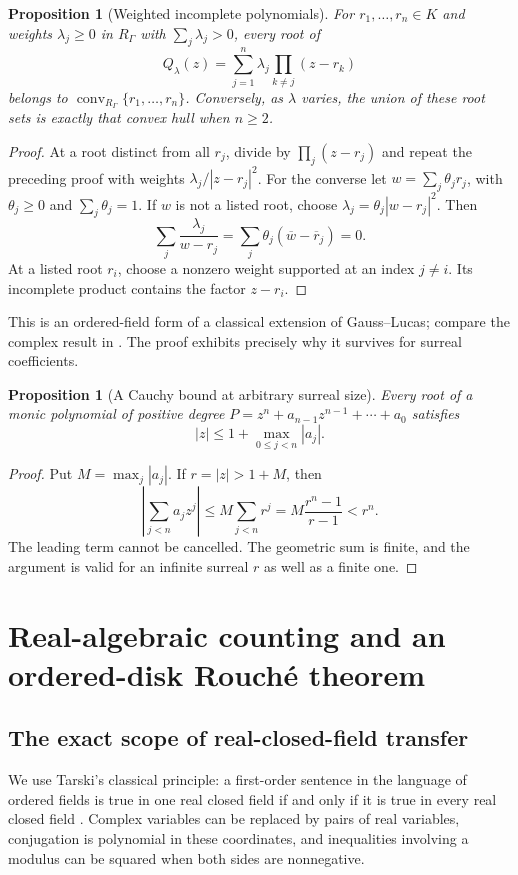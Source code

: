 \documentclass[11pt,letterpaper,oneside]{article}
\numberwithin{equation}{section}
\newtheorem{proposition}[theorem]{Proposition}
\theoremstyle{definition}
\theoremstyle{remark}\newtheorem{remark}[theorem]{Remark}
\newcommand{\conv}{\operatorname{conv}}\newcommand{\Bez}{\operatorname{Bez}}
\begin{document}
\begin{proposition}[Weighted incomplete polynomials]\label{prop:weighted}
For $r_1,\ldots,r_n\in K$ and weights $\lambda_j\geq0$ in $R_\Gamma$
with $\sum_j\lambda_j>0$, every root of
\[
 Q_\lambda(z)=\sum_{j=1}^n\lambda_j
       \prod_{k\ne j}(z-r_k)
\]
belongs to $\conv_{R_\Gamma}\{r_1,\ldots,r_n\}$. Conversely, as
$\lambda$ varies, the union of these root sets is exactly that convex hull
when $n\geq2$.
\end{proposition}
\begin{proof}
At a root distinct from all $r_j$, divide by $\prod_j(z-r_j)$ and repeat
the preceding proof with weights $\lambda_j/|z-r_j|^2$.
For the converse let $w=\sum_j\theta_jr_j$, with
$\theta_j\geq0$ and $\sum_j\theta_j=1$. If $w$ is not a listed root,
choose $\lambda_j=\theta_j|w-r_j|^2$. Then
\[
 \sum_j\frac{\lambda_j}{w-r_j}
 =\sum_j\theta_j(\overline w-\overline r_j)=0.
\]
At a listed root $r_i$, choose a nonzero weight supported at an index
$j\ne i$. Its incomplete product contains the factor $z-r_i$.
\end{proof}
This is an ordered-field form of a classical extension of Gauss--Lucas;
compare the complex result in \cite{Zhang}. The proof exhibits precisely
why it survives for surreal coefficients.

\begin{proposition}[A Cauchy bound at arbitrary surreal size]\label{prop:cauchy}
Every root of a monic polynomial of positive degree
$P=z^n+a_{n-1}z^{n-1}+\cdots+a_0$ satisfies
\[
 |z|\leq1+\max_{0\leq j<n}|a_j|.
\]
\end{proposition}
\begin{proof}
Put $M=\max_j|a_j|$. If $r=|z|>1+M$, then
\[
 \left|\sum_{j<n}a_jz^j\right|
 \leq M\sum_{j<n}r^j
 =M\frac{r^n-1}{r-1}<r^n.
\]
The leading term cannot be cancelled. The geometric sum is finite, and the
argument is valid for an infinite surreal $r$ as well as a finite one.
\end{proof}

\section{Real-algebraic counting and an ordered-disk Rouch\'e theorem}\label{sec:transfer}
\subsection{The exact scope of real-closed-field transfer}
We use Tarski's classical principle: a first-order sentence in the language
of ordered fields is true in one real closed field if and only if it is
true in every real closed field \cite{Swan}. Complex variables can be
replaced by pairs of real variables, conjugation is polynomial in these
coordinates, and inequalities involving a modulus can be squared when
both sides are nonnegative.
\end{document}

